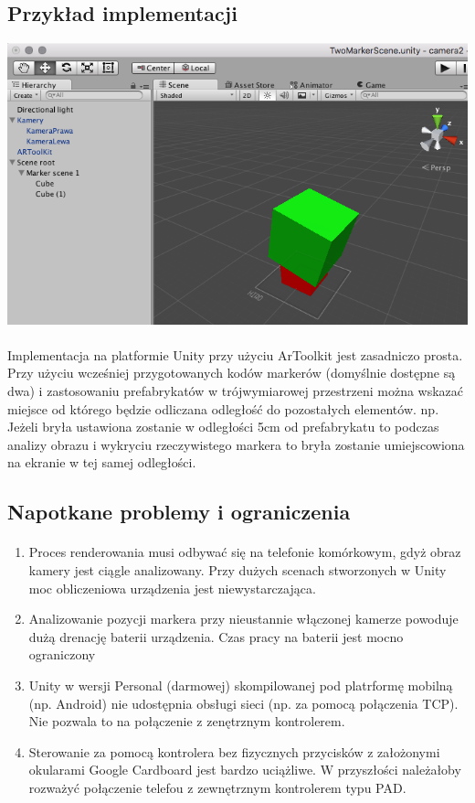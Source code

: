 \subsection{Przykład implementacji}
\begin{center}
\includegraphics[width=1\textwidth]{images/artoolkit-przyklad.png}
\end{center}
\paragraph{}
Implementacja na platformie Unity przy użyciu ArToolkit jest zasadniczo prosta. Przy użyciu wcześniej przygotowanych kodów markerów (domyślnie dostępne są dwa) i zastosowaniu prefabrykatów w trójwymiarowej przestrzeni można wskazać miejsce od którego będzie odliczana odległość do pozostałych elementów. np. Jeżeli bryła ustawiona zostanie w odległości 5cm od prefabrykatu to podczas analizy obrazu i wykryciu rzeczywistego markera to bryła zostanie umiejscowiona na ekranie w tej samej odległości.
\subsection{Napotkane problemy i ograniczenia}
\paragraph{}
\begin{enumerate}
	\item Proces renderowania musi odbywać się na telefonie komórkowym, gdyż obraz kamery jest ciągle analizowany. Przy dużych scenach stworzonych w Unity moc obliczeniowa urządzenia jest niewystarczająca.
	\item Analizowanie pozycji markera przy nieustannie włączonej kamerze powoduje dużą drenację baterii urządzenia. Czas pracy na baterii jest mocno ograniczony
	\item Unity w wersji Personal (darmowej) skompilowanej pod platrformę mobilną (np. Android) nie udostępnia obsługi sieci (np. za pomocą połączenia TCP). Nie pozwala to na połączenie z zenętrznym kontrolerem.
	\item Sterowanie za pomocą kontrolera bez fizycznych przycisków z założonymi okularami Google Cardboard jest bardzo uciążliwe. W przyszłości należałoby rozważyć połączenie telefou z zewnętrznym kontrolerem typu PAD\cite{pad}.
\end{enumerate}